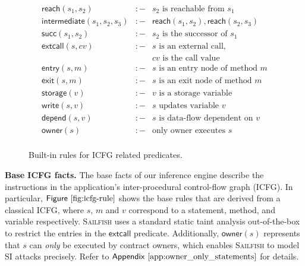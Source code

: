 \documentclass[conference, romanappendices]{tex/IEEEtran}
\theoremstyle{bfnote}
\newcommand{\toolname}{\textsc{Sailfish}\xspace}
\newcommand{\Fig}[1]{\ensuremath{\sf Figure~\ref{#1}}}
\newcommand{\Appen}[1]{\ensuremath{\sf Appendix~\ref{#1}}}
\begin{document}
\begin{figure}[ht]
	\vspace{-6mm}
	\small
    \[\begin{array}{rlll}
      \mathsf{reach}(s_1, s_2) & :- & \text{$s_2$ is reachable from $s_1$}\\
      \mathsf{intermediate}(s_1, s_2, s_3) & :- & \mathsf{reach}(s_1, s_2), \mathsf{reach}(s_2, s_3)\\
      \mathsf{succ}(s_1, s_2) & :- & \text{$s_2$ is the successor of $s_1$}\\
      \mathsf{extcall}(s, cv) & :- & \text{$s$ is an external call}, \\
                                   & & \text{$cv$ is the call value} \\ 
      \mathsf{entry}(s,m) & :- & \text{$s$ is an entry node of method $m$}\\
      \mathsf{exit}(s,m) & :- & \text{$s$ is an exit node of method $m$}\\
      \mathsf{storage}(v) & :- & \text{$v$ is a storage variable}\\
      \mathsf{write}(s, v) & :- & \text{$s$ updates variable $v$}\\
      \mathsf{depend}(s, v) & :- & \text{$s$ is data-flow dependent on $v$}\\
      \mathsf{owner}(s) & :- & \text{only owner executes $s$} \\
    \end{array}\]
    \vspace{-3.1mm}
    \caption{\small Built-in rules for ICFG related predicates.}
    \label{fig:icfg-rule}
    \vspace{-2.5mm}
\end{figure}

\noindent
\textbf{Base ICFG facts.}
The base facts of our inference engine describe the instructions in the application's inter-procedural control-flow graph (ICFG).
In particular, \Fig{fig:icfg-rule} shows the base rules that are derived from a classical ICFG, where $s$, $m$ and $v$ correspond to a statement,  method, and variable respectively.
\toolname uses a standard static taint analysis out-of-the-box to restrict the entries in the $\mathsf{extcall}$ predicate.
Additionally, $\mathsf{owner}(s)$ represents that $s$ can \textit{only} be executed by contract owners, which enables \toolname to model SI attacks precisely.
Refer to \Appen{app:owner_only_statements} for details.
\end{document}
